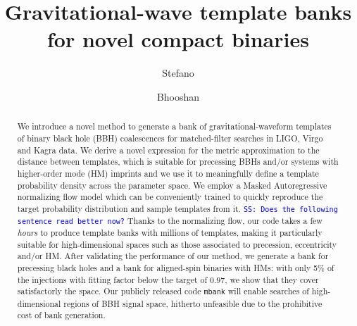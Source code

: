\documentclass[twocolumn,showpacs,preprintnumbers,nofootinbib,prd,
superscriptaddress,10pt]{revtex4-2}
\newcommand{\stefano}[1]{{\textcolor{blue}{\texttt{SS: #1}} }}
\begin{document}
\begin{abstract}
	We introduce a novel method to generate a bank of gravitational-waveform templates of binary black hole (BBH) coalescences for matched-filter searches in LIGO, Virgo and Kagra data.
	We derive a novel expression for the metric approximation to the distance between templates, which is suitable for precessing BBHs and/or systems with higher-order mode (HM) imprints and we use it to meaningfully define a template probability density across the parameter space.
	We employ a Masked Autoregressive normalizing flow model which can be conveniently trained to quickly reproduce the target probability distribution and sample templates from it.
	\stefano{Does the following sentence read better now?}
	Thanks to the normalizing flow, our code takes a few {\it hours} to produce template banks with millions of templates, making it particularly suitable for high-dimensional spaces such as those associated to precession, eccentricity and/or HM.
	After validating the performance of our method, we generate a bank for precessing black holes and a bank for aligned-spin binaries with HMs: with only 5\% of the injections with fitting factor below the target of $0.97$, we show that they cover satisfactorly the space.
	Our publicly released code \texttt{mbank} will enable searches of high-dimensional regions of BBH signal space, hitherto unfeasible due to the prohibitive cost of bank generation.
	
\end{abstract}
	
 \title{Gravitational-wave template banks for novel compact binaries}
	\author{Stefano }

	\author{Bhooshan }
        
\end{document}
